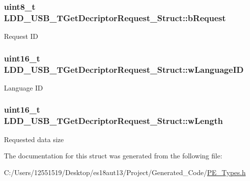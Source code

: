 \subsubsection[{b\+Request}]{\setlength{\rightskip}{0pt plus 5cm}uint8\+\_\+t L\+D\+D\+\_\+\+U\+S\+B\+\_\+\+T\+Get\+Decriptor\+Request\+\_\+\+Struct\+::b\+Request}\label{struct_l_d_d___u_s_b___t_get_decriptor_request___struct_aa7651472aa5110086f335c0b79c0bc5b}
Request I\+D \hypertarget{struct_l_d_d___u_s_b___t_get_decriptor_request___struct_a228c41af26c45c1fa18d964c0702a4b4}{}
\subsubsection[{w\+Language\+I\+D}]{\setlength{\rightskip}{0pt plus 5cm}uint16\+\_\+t L\+D\+D\+\_\+\+U\+S\+B\+\_\+\+T\+Get\+Decriptor\+Request\+\_\+\+Struct\+::w\+Language\+I\+D}\label{struct_l_d_d___u_s_b___t_get_decriptor_request___struct_a228c41af26c45c1fa18d964c0702a4b4}
Language I\+D \hypertarget{struct_l_d_d___u_s_b___t_get_decriptor_request___struct_af9ac7409b4031aa6f3ec5da9d79b06eb}{}
\subsubsection[{w\+Length}]{\setlength{\rightskip}{0pt plus 5cm}uint16\+\_\+t L\+D\+D\+\_\+\+U\+S\+B\+\_\+\+T\+Get\+Decriptor\+Request\+\_\+\+Struct\+::w\+Length}\label{struct_l_d_d___u_s_b___t_get_decriptor_request___struct_af9ac7409b4031aa6f3ec5da9d79b06eb}
Requested data size 

The documentation for this struct was generated from the following file\+:\begin{DoxyCompactItemize}
\item 
C\+:/\+Users/12551519/\+Desktop/es18aut13/\+Project/\+Generated\+\_\+\+Code/\hyperlink{_p_e___types_8h}{P\+E\+\_\+\+Types.\+h}\end{DoxyCompactItemize}
